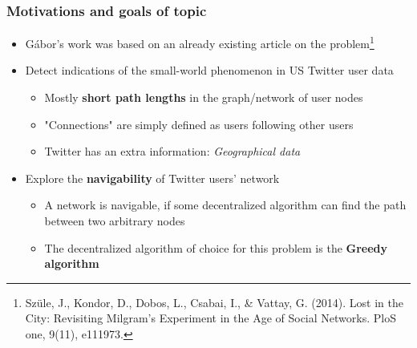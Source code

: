 \begin{frame}
\frametitle{Motivations and goals of topic}

\begin{itemize}
		\item<1-> Gábor's work was based on an already existing article on the problem\footnote<1->{Szüle, J., Kondor, D., Dobos, L., Csabai, I., \& Vattay, G. (2014). Lost in the City: Revisiting Milgram's Experiment in the Age of Social Networks. PloS one, 9(11), e111973.}
	\item<2-> Detect indications of the small-world phenomenon in US Twitter user data
	\begin{itemize}
		\item<2-> Mostly \textbf{short path lengths} in the graph/network of user nodes
		\item<2-> "Connections" are simply defined as users following other users
		\item<2-> Twitter has an extra information: \textit{Geographical data}
	\end{itemize}
	\item<3-> Explore the \textbf{navigability} of Twitter users' network
	\begin{itemize}
		\item<3-> A network is navigable, if some decentralized algorithm can find the path between two arbitrary nodes
		\item<3-> The decentralized algorithm of choice for this problem is the \textbf{Greedy algorithm}
	\end{itemize}	
\end{itemize}

\end{frame}